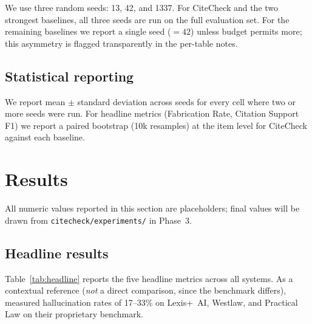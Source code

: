 \documentclass[11pt]{article}
\begin{document}
We use three random seeds: 13, 42, and 1337. For CiteCheck and the
two strongest baselines, all three seeds are run on the full
evaluation set. For the remaining baselines we report a single seed
($=42$) unless budget permits more; this asymmetry is flagged
transparently in the per-table notes.

\subsection{Statistical reporting}
\label{sec:setup:stats}

We report mean $\pm$ standard deviation across seeds for every cell
where two or more seeds were run. For headline metrics (Fabrication
Rate, Citation Support F1) we report a paired bootstrap (10k
resamples) at the item level for CiteCheck against each baseline.

\section{Results}
\label{sec:results}

All numeric values reported in this section are placeholders; final
values will be drawn from \texttt{citecheck/experiments/} in Phase~3.

\subsection{Headline results}
\label{sec:results:headline}

Table~\ref{tab:headline} reports the five headline metrics across all
systems. As a contextual reference (\emph{not} a direct comparison,
since the benchmark differs), \citet{magesh2025hallucination} measured
hallucination rates of 17--33\% on Lexis+~AI, Westlaw, and Practical
Law on their proprietary benchmark.
\end{document}
